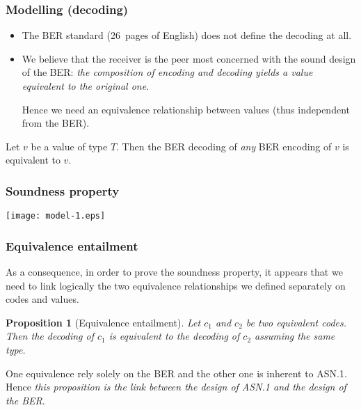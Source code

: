\documentclass[compress,dvips,xcolor={dvipsnames},t]{beamer}
\newtheorem{proposition}{Proposition}
\newcommand\ASN{\textsf{ASN.1}\xspace}
\begin{document}
\begin{frame}
\frametitle{Modelling (decoding)}

\begin{itemize}

  \item The BER standard (26~pages of English) does not define the
  decoding at all.

  \item We believe that the receiver is the peer most concerned with
  the sound design of the BER: \emph{the composition of encoding and
  decoding yields a value equivalent to the original one}.

  Hence we need an equivalence relationship between values
  (thus independent from the BER).

\end{itemize}

  \begin{theorem}[Soundness]
    Let $v$ be a value of type $T$. Then the BER decoding of
    \emph{any} BER encoding of $v$ is equivalent to $v$.
  \end{theorem}

\end{frame}

\begin{frame}
\frametitle{Soundness property}

\centerline{\texttt{[image: model-1.eps]}}

\end{frame}


\begin{frame}
\frametitle{Equivalence entailment}

As a consequence, in order to prove the soundness property, it appears
that we need to link logically the two equivalence relationships we
defined separately on codes and values.

\begin{proposition}[Equivalence entailment]
Let $c_1$ and $c_2$ be two equivalent codes. Then the decoding of
$c_1$ is equivalent to the decoding of $c_2$ assuming the same type.
\end{proposition}

One equivalence rely solely on the BER and the other one is inherent
to \ASN. Hence \emph{this proposition is the link between the design
of \ASN and the design of the BER}.

\end{frame}
\end{document}
